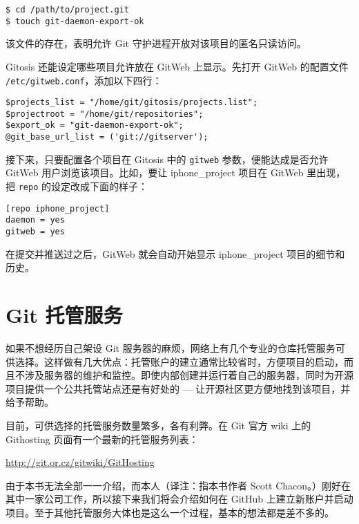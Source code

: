 \documentclass[a4paper]{book}
\begin{document}
\begin{shaded}\begin{verbatim}
$ cd /path/to/project.git
$ touch git-daemon-export-ok
\end{verbatim}\end{shaded}

该文件的存在，表明允许 Git 守护进程开放对该项目的匿名只读访问。

Gitosis 还能设定哪些项目允许放在 GitWeb 上显示。先打开 GitWeb 的配置文件 \texttt{/etc/gitweb.conf}，添加以下四行：

\begin{shaded}\begin{verbatim}
$projects_list = "/home/git/gitosis/projects.list";
$projectroot = "/home/git/repositories";
$export_ok = "git-daemon-export-ok";
@git_base_url_list = ('git://gitserver');
\end{verbatim}\end{shaded}

接下来，只要配置各个项目在 Gitosis 中的 \texttt{gitweb} 参数，便能达成是否允许 GitWeb 用户浏览该项目。比如，要让 iphone\_project 项目在 GitWeb 里出现，把 \texttt{repo} 的设定改成下面的样子：

\begin{shaded}\begin{verbatim}
[repo iphone_project]
daemon = yes
gitweb = yes
\end{verbatim}\end{shaded}

在提交并推送过之后，GitWeb 就会自动开始显示 iphone\_project 项目的细节和历史。

\section{Git 托管服务}

如果不想经历自己架设 Git 服务器的麻烦，网络上有几个专业的仓库托管服务可供选择。这样做有几大优点：托管账户的建立通常比较省时，方便项目的启动，而且不涉及服务器的维护和监控。即使内部创建并运行着自己的服务器，同时为开源项目提供一个公共托管站点还是有好处的 --- 让开源社区更方便地找到该项目，并给予帮助。

目前，可供选择的托管服务数量繁多，各有利弊。在 Git 官方 wiki 上的 Githosting 页面有一个最新的托管服务列表：

\url{http://git.or.cz/gitwiki/GitHosting}

由于本书无法全部一一介绍，而本人（译注：指本书作者 Scott Chacon。）刚好在其中一家公司工作，所以接下来我们将会介绍如何在 GitHub 上建立新账户并启动项目。至于其他托管服务大体也是这么一个过程，基本的想法都是差不多的。
\end{document}
